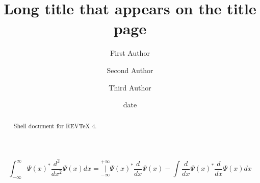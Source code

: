 \documentclass[aps,preprint]{revtex4}%
\begin{document}
\title[Short title for running header]{Long title that appears on the title page}
\author{First Author}
\author{Second Author}
\author{Third Author}

\begin{abstract}
Shell document for REV\TeX{} 4.

\end{abstract}
\date[Date text]{date}




\maketitle
\tableofcontents


\bigskip%

\begin{equation}
\int_{-\infty}^{\infty}\Psi\left(  x\right)  ^{\ast}\frac{d^{2}}{dx^{2}}%
\Psi\left(  x\right)  dx=\underset{-\infty}{\overset{+\infty}{|}}\Psi\left(
x\right)  ^{\ast}\frac{d}{dx}\Psi\left(  x\right)  -\int\frac{d}{dx}%
\Psi\left(  x\right)  ^{\ast}\frac{d}{dx}\Psi\left(  x\right)  dx
\end{equation}
\end{document}

